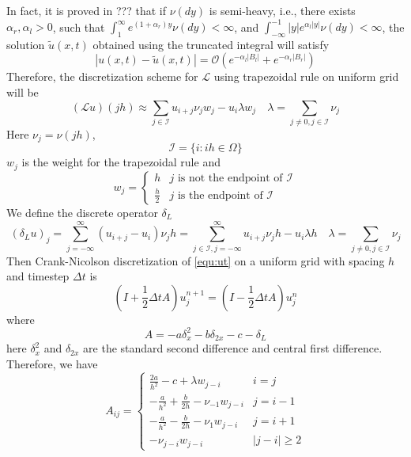 \documentclass[10pt,a4paper]{article}
\theoremstyle{definition}
\begin{document}
In fact, it is proved in ??? that if $\nu(dy)$ is semi-heavy, i.e., there exists $\alpha_r,\alpha_l>0$, such that $\int_1^\infty e^{(1+\alpha_r)y}\nu(dy)<\infty$, and $\int_{-\infty}^{-1}|y|e^{\alpha_l|y|}\nu(dy)<\infty$, the solution $\tilde u(x,t)$ obtained using the truncated integral will satisfy
\begin{equation}\label{equ:small}
	|u( x,t)-\tilde u(x,t)| =\mathcal{O}(e^{-\alpha_l|B_l|}+e^{-\alpha_r|B_r|})
\end{equation}
Therefore, the discretization scheme for $\mathcal{L}$ using trapezoidal rule on uniform grid will be
\begin{equation}
	(\mathcal{L} u)(jh) \approx   \sum_{j\in \mathcal{I}} u_{i+j}\nu_j w_j - u_i \lambda w_j\quad \lambda = \sum_{j\neq 0, j\in \mathcal{I}} \nu_j
\end{equation}
Here $\nu_j=\nu(jh)$, 
\begin{equation}
	\mathcal{I} = \{i: ih\in \Omega\}
\end{equation}
$w_j$ is the weight for the trapezoidal rule and 
\begin{equation}
	w_j = \begin{cases}
		h & j \mbox{ is not the endpoint of } \mathcal{I}\\
		\frac{h}{2} & j \mbox{ is the endpoint of } \mathcal{I}
	\end{cases}
\end{equation}
We define the discrete operator $\delta_L$
\begin{equation}\label{equ:dl}
	(\delta_L u)_j = \sum_{j=-\infty}^\infty (u_{i+j}-u_i)\nu_j h =  \sum_{j\in \mathcal{I}, j=-\infty}^\infty u_{i+j}\nu_j h - u_i \lambda h\quad \lambda = \sum_{j\neq 0, j\in \mathcal{I}} \nu_j
\end{equation}
Then Crank-Nicolson discretization of \cref{equ:ut} on a uniform grid with spacing $h$ and timestep $\Delta t$ is 
\begin{equation}\label{equ:scheme}
	(I+\frac{1}{2}\Delta tA)u_j^{n+1} = (I-\frac{1}{2}\Delta tA)u_j^n
\end{equation}
where 
\begin{equation}
	A = -a\delta_x^2 - b\delta_{2x} - c - \delta_L
\end{equation}
here $\delta_x^2$ and $\delta_{2x}$ are the standard second difference and central first difference. 
Therefore, we have
\begin{equation}\label{equ:Aij}
  {A_{ij}} = 
  \begin{cases}
  	{\frac{{2a}}{{{h^2}}} - c + \lambda w_{j-i}} & i=j\\
{ - \frac{a}{{{h^2}}} + \frac{b}{{2h}} - {\nu _{ - 1}w_{j-i}}} & j=i-1\\
{ - \frac{a}{{{h^2}}} - \frac{b}{{2h}} - {\nu _1}w_{j-i}} & j=i+1\\
{ - {\nu _{j - i}w_{j-i}}} & |j-i|\geq 2
  \end{cases}
\end{equation}
 
\end{document}
